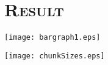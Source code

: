 \documentclass[FinalReport.tex]{subfiles}
\begin{document}
\bigskip

\section*{\textsc{\Large Result}}

\begin{center}
\texttt{[image: bargraph1.eps]}
\end{center}

\begin{center}
\texttt{[image: chunkSizes.eps]}
\end{center}
\end{document}
